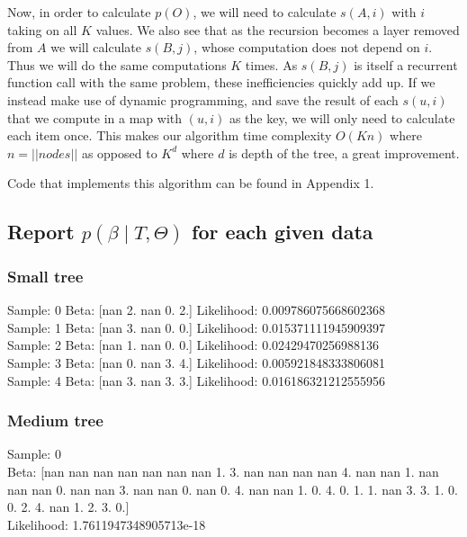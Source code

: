 \documentclass[11pt,a4paper]{article}
\begin{document}
Now, in order to calculate $p(O)$, we will need to calculate $s(A, i)$ with $i$ taking on all $K$ values. We also see that as the recursion becomes a layer removed from $A$ we will calculate $s(B, j)$, whose computation does not depend on $i$. Thus we will do the same computations $K$ times. As $s(B, j)$ is itself a recurrent function call with the same problem, these inefficiencies quickly add up. If we instead make use of dynamic programming, and save the result of each $s(u, i)$ that we compute in a map with $(u, i)$ as the key, we will only need to calculate each item once. This makes our algorithm time complexity  $O(Kn)$ where $n= ||nodes||$ as opposed to $K^{d}$ where $d$ is depth of the tree, a great improvement.

Code that implements this algorithm can be found in Appendix 1.

\subsection{Report $p(\beta \mid T, \Theta)$ for each given data}

\subsubsection{Small tree}

	Sample:  0 	Beta:  [nan  2. nan  0.  2.]
	Likelihood:  0.009786075668602368\\

	Sample:  1 	Beta:  [nan  3. nan  0.  0.]
	Likelihood:  0.015371111945909397\\

	Sample:  2 	Beta:  [nan  1. nan  0.  0.]
	Likelihood:  0.02429470256988136\\

	Sample:  3 	Beta:  [nan  0. nan  3.  4.]
	Likelihood:  0.005921848333806081\\

	Sample:  4 	Beta:  [nan  3. nan  3.  3.]
	Likelihood:  0.016186321212555956\\

\subsubsection{Medium tree}

	Sample:  0 \\	Beta:  [nan nan nan nan nan nan nan  1.  3. nan nan nan nan  4. nan nan  1. nan
 nan nan  0. nan nan  3. nan nan  0. nan  0.  4. nan nan  1.  0.  4.  0.
  1.  1. nan  3.  3.  1.  0.  0.  2.  4. nan  1.  2.  3.  0.]\\
	Likelihood:  1.7611947348905713e-18\\
\end{document}
